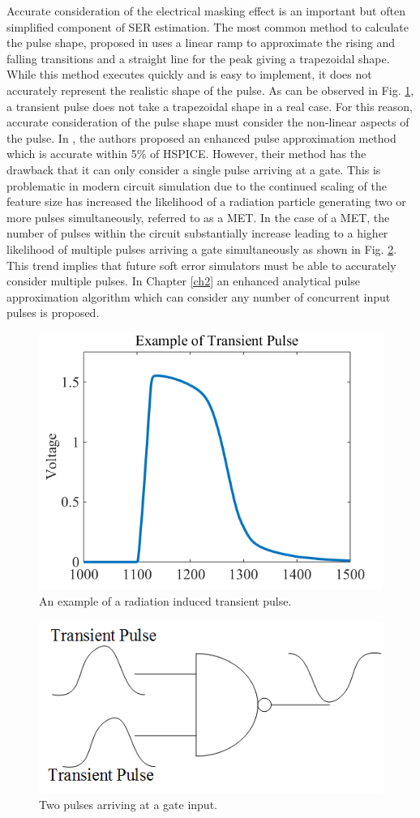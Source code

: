 Accurate consideration of the electrical masking effect is an important but often simplified component of SER estimation. The most common method to calculate the pulse shape, proposed in \cite{Omana_Trap} uses a linear ramp to approximate the rising and falling transitions and a straight line for the peak giving a trapezoidal shape. While this method executes quickly and is easy to implement, it does not accurately represent the realistic shape of the pulse. As can be observed in Fig. \ref{T_pulse}, a transient pulse does not take a trapezoidal shape in a real case. For this reason, accurate consideration of the pulse shape must consider the non-linear aspects of the pulse. In \cite{Accurate_Masking}, the authors proposed an enhanced pulse approximation method which is accurate within 5\% of HSPICE. However, their method has the drawback that it can only consider a single pulse arriving at a gate. This is problematic in modern circuit simulation due to the continued scaling of the feature size has increased the likelihood of a radiation particle generating two or more pulses simultaneously, referred to as a MET.
In the case of a MET, the number of pulses within the circuit substantially increase leading to a higher likelihood of multiple pulses arriving a gate simultaneously as shown in Fig. \ref{G_pulse}. This trend implies that future soft error simulators must be able to accurately consider multiple pulses. In Chapter \ref{ch2} an enhanced analytical pulse approximation algorithm which can consider any number of concurrent input pulses is proposed.

\begin{figure}[!htbp]
	\centering
	\includegraphics[width=0.45\linewidth]{Figures/Pulse_Shape}
	\caption{An example of a radiation induced transient pulse.}
	\label{T_pulse}
\end{figure} 

\begin{figure}[!htbp]
	\centering
	\includegraphics[width=0.45\linewidth]{Figures/gatepulse}
	\caption{Two pulses arriving at a gate input.}
	\label{G_pulse}
\end{figure} 

